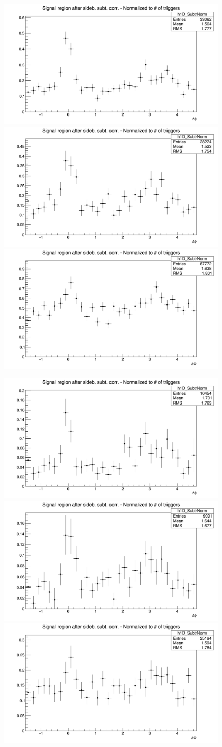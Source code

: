 \begin{figure}[!htbp]
\centering
{\includegraphics[width=0.31\linewidth, height=0.23\linewidth]{figures/Dzero/AzimCorrDistr_Dzero_Canvas_PtIntBins6to8_PoolInt_thr2dotto99dot.png}}
{\includegraphics[width=0.31\linewidth, height=0.23\linewidth]{figures/DplusPlotsweff/AzimCorrDistr_Dplus_Canvas_PtIntBins5to7_PoolInt_thr2dotto99dot.png}}
{\includegraphics[width=0.31\linewidth, height=0.23\linewidth]{figures/Dstar_wEFF/AzimCorrDistr_Dstar_Canvas_PtIntBins4to6_PoolInt_thr2dotto99dot.png}}

{\includegraphics[width=0.31\linewidth, height=0.23\linewidth]{figures/Dzero/AzimCorrDistr_Dzero_Canvas_PtIntBins6to8_PoolInt_thr3dotto99dot.png}}
{\includegraphics[width=0.31\linewidth, height=0.23\linewidth]{figures/DplusPlotsweff/AzimCorrDistr_Dplus_Canvas_PtIntBins5to7_PoolInt_thr3dotto99dot.png}}
{\includegraphics[width=0.31\linewidth, height=0.23\linewidth]{figures/Dstar_wEFF/AzimCorrDistr_Dstar_Canvas_PtIntBins4to6_PoolInt_thr3dotto99dot.png}}


\end{figure}

